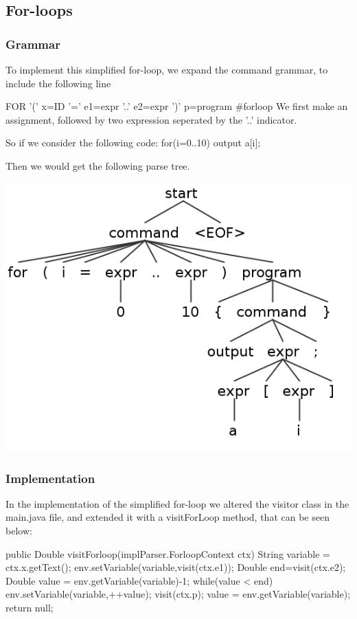 \documentclass[a4paper]{article}
\newenvironment{code}%
   {\snugshade\verbatim}%
   {\endverbatim\endsnugshade}
\begin{document}
\subsection{For-loops}

\subsubsection{Grammar}
To implement this simplified for-loop, we expand the command grammar, to include the following line
  
\begin{code}
FOR '(' x=ID '=' e1=expr '..' e2=expr ')' p=program		#forloop
\end{code}
We first make an assignment, followed by two expression seperated by the '..' indicator. 

So if we consider the following code:
\begin{code}
for(i=0..10){
    output a[i];
}
\end{code}

Then we would get the following parse tree.

\begin{center}
  \includegraphics[width=.5\textwidth]{task2-2.png}
\end{center}
  
\subsubsection{Implementation}
In the implementation of the simplified for-loop we altered the visitor class in the main.java file, and extended it with a visitForLoop method, that can be seen below:
  
\begin{code}
public Double visitForloop(implParser.ForloopContext ctx){
    String variable = ctx.x.getText();
    env.setVariable(variable,visit(ctx.e1));
    Double end=visit(ctx.e2);
    Double value = env.getVariable(variable)-1;
    while(value < end){
        env.setVariable(variable,++value);
        visit(ctx.p);
        value = env.getVariable(variable);
    }
    return null;
  }
\end{code}
\end{document}

